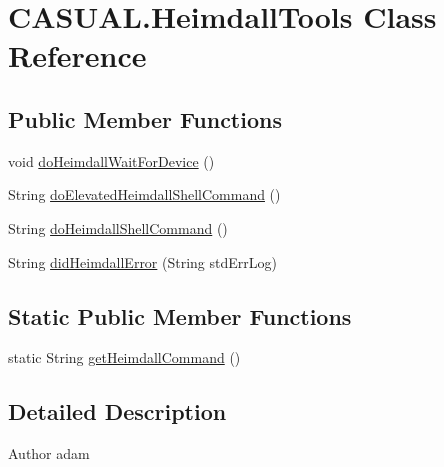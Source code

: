 \hypertarget{classCASUAL_1_1HeimdallTools}{\section{C\-A\-S\-U\-A\-L.\-Heimdall\-Tools Class Reference}
\label{classCASUAL_1_1HeimdallTools}
}
\subsection*{Public Member Functions}
\begin{DoxyCompactItemize}
\item 
void \hyperlink{classCASUAL_1_1HeimdallTools_af64f9e031d33e50778af32a812eb2188}{do\-Heimdall\-Wait\-For\-Device} ()
\item 
String \hyperlink{classCASUAL_1_1HeimdallTools_af06559bcbdf984cb99d7d0a2490e8bb6}{do\-Elevated\-Heimdall\-Shell\-Command} ()
\item 
String \hyperlink{classCASUAL_1_1HeimdallTools_ad9817f83a5a51de3e1a11c3a561ca10e}{do\-Heimdall\-Shell\-Command} ()
\item 
String \hyperlink{classCASUAL_1_1HeimdallTools_a08c2dafb0094c3c867bcb3188a5170f3}{did\-Heimdall\-Error} (String std\-Err\-Log)
\end{DoxyCompactItemize}
\subsection*{Static Public Member Functions}
\begin{DoxyCompactItemize}
\item 
static String \hyperlink{classCASUAL_1_1HeimdallTools_a2a78a83cbc516c7a801e4212b71cc925}{get\-Heimdall\-Command} ()
\end{DoxyCompactItemize}


\subsection{Detailed Description}
\begin{DoxyAuthor}{Author}
adam 
\end{DoxyAuthor}



